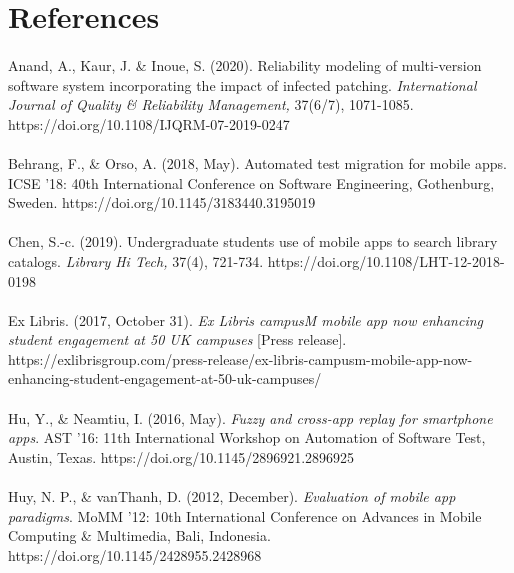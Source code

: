 
\section{References}

\paragraph{}Anand, A., Kaur, J. & Inoue, S. (2020). Reliability modeling of multi-version software system incorporating the impact of infected patching. \textit{International Journal of Quality & Reliability Management,} 37(6/7), 1071-1085. https://doi.org/10.1108/IJQRM-07-2019-0247 


\paragraph{}
Behrang, F., & Orso, A. (2018, May). Automated test migration for mobile apps. ICSE '18: 40th International Conference on Software Engineering, Gothenburg, Sweden. https://doi.org/10.1145/3183440.3195019 

\paragraph{}
Chen, S.-c. (2019). Undergraduate students use of mobile apps to search library catalogs. \textit{Library Hi Tech,} 37(4), 721-734. https://doi.org/10.1108/LHT-12-2018-0198 

\paragraph{}
Ex Libris. (2017, October 31). \textit{Ex Libris campusM mobile app now enhancing student engagement at 50 UK campuses} [Press release]. https://exlibrisgroup.com/press-release/ex-libris-campusm-mobile-app-now-enhancing-student-engagement-at-50-uk-campuses/

\paragraph{}
Hu, Y., & Neamtiu, I. (2016, May). \textit{Fuzzy and cross-app replay for smartphone apps}. AST ’16: 11th International Workshop on Automation of Software Test, Austin, Texas. https://doi.org/10.1145/2896921.2896925

\paragraph{}
Huy, N. P., & vanThanh, D. (2012, December). \textit{Evaluation of mobile app paradigms}. MoMM '12: 10th International Conference on Advances in Mobile Computing & Multimedia, Bali, Indonesia. https://doi.org/10.1145/2428955.2428968

